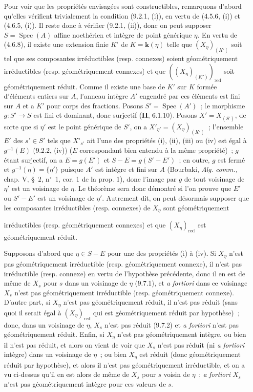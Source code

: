 Pour voir que les propriétés envisagées sont constructibles, remarquons d'abord
qu'elles vérifient trivialement la condition (9.2.1, (i)), en vertu de
(4.5.6, (i)) et (4.6.5, (i)). Il reste donc à vérifier (9.2.1, (ii)), donc on
peut supposer $S=\operatorname{Spec}(A)$ affine noethérien et intègre de point
générique $\eta$. En vertu de (4.6.8), il existe une extension finie $K'$ de
$K=\boldsymbol{k}(\eta)$ telle que $(X_\eta)_{(K')}$ soit tel que ses
composantes irréductibles (resp. connexes) soient géométriquement irréductibles
(resp. géométriquement connexes) et que $((X_\eta)_{(K')})_{\mathrm{red}}$ soit
géométriquement réduit. Comme il existe une base de $K'$ sur $K$ formée
d'éléments entiers sur $A$, l'anneau intègre $A'$ engendré par ces éléments est
fini sur $A$ et a $K'$ pour corps des fractions. Posons
$S'=\operatorname{Spec}(A')$~; le morphisme $g:S'\to S$ est fini et dominant,
donc surjectif (\textbf{II}, 6.1.10). Posons $X'=X_{(S')}$, de sorte que si
$\eta'$ est le point générique de $S'$, on a
$X'_{\eta'}=(X_\eta)_{(K')}$~; l'ensemble $E'$ des $s'\in S'$ tels que
$X'_{s'}$ ait l'une des propriétés (i), (ii), (iii) ou (iv) est égal à
$g^{-1}(E)$ (9.2.2, (iv)) ($E$ correspondant bien entendu à la même propriété)~;
$g$ étant surjectif, on a $E=g(E')$ et $S-E=g(S'-E')$~; en outre, $g$ est fermé
et $g^{-1}(\eta)=\{\eta'\}$ puisque $A'$ est intègre et fini sur $A$ (Bourbaki,
\emph{Alg. comm.}, chap. V, \S~2, n$^\circ$~1, cor. 1 de la prop. 1), donc
l'image par $g$ de tout voisinage de $\eta'$ est un voisinage de $\eta$. Le
théorème sera donc démontré si l'on prouve que $E'$ ou $S'-E'$ est un voisinage
de $\eta'$. Autrement dit, on peut désormais supposer que les composantes
irréductibles (resp. connexes) de $X_\eta$ sont géométriquement


irréductibles (resp. géométriquement connexes) et que $(X_\eta)_{\mathrm{red}}$
est géométriquement réduit.

Supposons d'abord que $\eta\in S-E$ pour une des propriétés (i) à (iv). Si
$X_\eta$ n'est pas géométriquement irréductible (resp. géométriquement connexe),
il n'est pas irréductible (resp. connexe) en vertu de l'hypothèse précédente,
donc il en est de même de $X_s$ pour $s$ dans un voisinage de $\eta$ (9.7.1), et
\emph{a fortiori} dans ce voisinage $X_s$ n'est pas géométriquement irréductible
(resp. géométriquement connexe). D'autre part, si $X_\eta$ n'est pas
géométriquement réduit, il n'est pas réduit (sans quoi il serait égal à
$(X_\eta)_{\mathrm{red}}$ qui est géométriquement réduit par hypothèse)~; donc,
dans un voisinage de $\eta$, $X_s$ n'est pas réduit (9.7.2) et \emph{a fortiori}
n'est pas géométriquement réduit. Enfin, si $X_\eta$ n'est pas géométriquement
intègre, ou bien il n'est pas réduit, et alors on vient de voir que $X_s$ n'est
pas réduit (ni \emph{a fortiori} intègre) dans un voisinage de $\eta$~; ou bien
$X_\eta$ est réduit (donc géométriquement réduit par hypothèse), et alors il
n'est pas géométriquement irréductible, et on a vu ci-dessus qu'il en est alors
de même de $X_s$ pour $s$ voisin de $\eta$~; \emph{a fortiori} $X_s$ n'est pas
géométriquement intègre pour ces valeurs de $s$.

